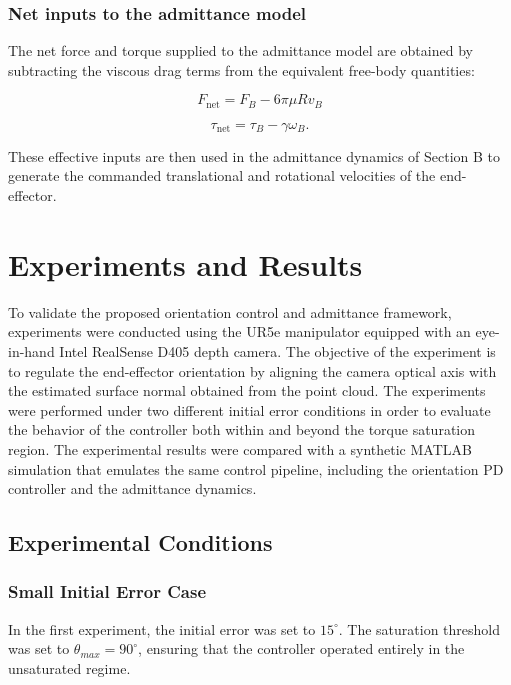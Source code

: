 \documentclass[journal]{IEEEtran}
\begin{document}
\subsubsection{Net inputs to the admittance model}

The net force and torque supplied to the admittance model are obtained by subtracting the viscous drag terms from the equivalent free-body quantities:

\begin{equation}
F_{\mathrm{net}} = F_B - 6\pi \mu R v_B
\end{equation}

\begin{equation}
\tau_{\mathrm{net}} = \tau_B - \gamma \omega_B.
\end{equation}

These effective inputs are then used in the admittance dynamics of Section B to generate the commanded translational and rotational velocities of the end-effector.
\section{Experiments and Results}

To validate the proposed orientation control and admittance framework, experiments were conducted using the UR5e manipulator equipped with an eye-in-hand Intel RealSense D405 depth camera. The objective of the experiment is to regulate the end-effector orientation by aligning the camera optical axis with the estimated surface normal obtained from the point cloud.
The experiments were
performed under two different initial error conditions in order
to evaluate the behavior of the controller both within and
beyond the torque saturation region.
 The experimental results were compared with a synthetic MATLAB simulation that emulates the same control pipeline, including the orientation PD controller and the admittance dynamics.
\subsection{Experimental Conditions}
\subsubsection{Small Initial Error Case}

In the first experiment, the initial error was set to $15^\circ$. The saturation threshold was set to $\theta_{max} = 90^\circ$, ensuring that the controller operated entirely in the unsaturated regime.
\end{document}
